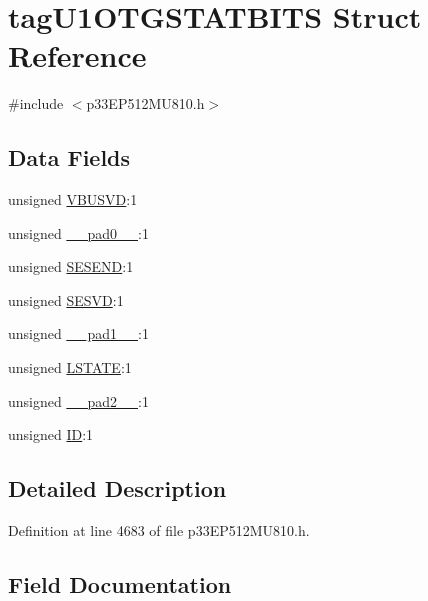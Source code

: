 \hypertarget{structtag_u1_o_t_g_s_t_a_t_b_i_t_s}{}\section{tag\+U1\+O\+T\+G\+S\+T\+A\+T\+B\+I\+TS Struct Reference}
\label{structtag_u1_o_t_g_s_t_a_t_b_i_t_s}


{\ttfamily \#include $<$p33\+E\+P512\+M\+U810.\+h$>$}

\subsection*{Data Fields}
\begin{DoxyCompactItemize}
\item 
unsigned \hyperlink{structtag_u1_o_t_g_s_t_a_t_b_i_t_s_afe00aa21bc660bc6c6d86b3928f5155a}{V\+B\+U\+S\+VD}\+:1
\item 
unsigned \hyperlink{structtag_u1_o_t_g_s_t_a_t_b_i_t_s_adf71f3d8410c1f1dbbc96680a92c49af}{\+\_\+\+\_\+pad0\+\_\+\+\_\+}\+:1
\item 
unsigned \hyperlink{structtag_u1_o_t_g_s_t_a_t_b_i_t_s_a76cb89d0989a2b541cc71b0b5634a8c2}{S\+E\+S\+E\+ND}\+:1
\item 
unsigned \hyperlink{structtag_u1_o_t_g_s_t_a_t_b_i_t_s_a522e04b51c3c0fdf0b2b67ca1975e922}{S\+E\+S\+VD}\+:1
\item 
unsigned \hyperlink{structtag_u1_o_t_g_s_t_a_t_b_i_t_s_acaf2d0924a107ec6e8d2e31febaf66f9}{\+\_\+\+\_\+pad1\+\_\+\+\_\+}\+:1
\item 
unsigned \hyperlink{structtag_u1_o_t_g_s_t_a_t_b_i_t_s_affef064d5657a34c17b73d660dcf504f}{L\+S\+T\+A\+TE}\+:1
\item 
unsigned \hyperlink{structtag_u1_o_t_g_s_t_a_t_b_i_t_s_a4d97cc5f7d51d22fc2bf3eab35c9cb7f}{\+\_\+\+\_\+pad2\+\_\+\+\_\+}\+:1
\item 
unsigned \hyperlink{structtag_u1_o_t_g_s_t_a_t_b_i_t_s_ac6aae43c72cdc2c322ef01d6621a805b}{ID}\+:1
\end{DoxyCompactItemize}


\subsection{Detailed Description}


Definition at line 4683 of file p33\+E\+P512\+M\+U810.\+h.



\subsection{Field Documentation}
\mbox{\label{structtag_u1_o_t_g_s_t_a_t_b_i_t_s_adf71f3d8410c1f1dbbc96680a92c49af}} 
